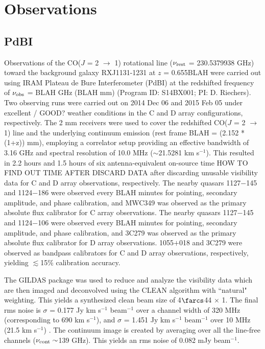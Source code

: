 \documentclass[]{emulateapj}
\begin{document}
\author{Draft}


\section{Observations}
\subsection{PdBI} \label{sec:PdBIdata}
Observations of the CO($J$ = 2 $\rightarrow$ 1) rotational line ($\nu_{\rm rest}$ = 230.5379938 GHz) toward the background galaxy RXJ1131-1231 at $z$ = 0.655BLAH
 were carried out using IRAM Plateau de Bure Interferometer (PdBI) at the redshifted frequency of $\nu_{\rm obs}$ = 
 BLAH GHz (BLAH mm) (Program ID: S14BX001; PI: D. Riechers). 
 Two observing runs were carried out on 2014 Dec 06 and 2015 Feb 05 under excellent / GOOD? 
weather conditions in the C and D array configurations, respectively. The 2 mm receivers were used to cover the redshifted CO($J$ = 2 $\rightarrow$ 1) line and the underlying continuum emission (rest frame BLAH = (2.152 * (1+z)) mm), employing a correlator setup providing an effective bandwidth of 3.16 GHz and spectral resolution of 10.0 MHz ($\sim$21.5281 km s$^{-1}$).
This resulted in 2.2 hours and 1.5 hours of six antenna-equivalent on-source time 
HOW TO FIND OUT TIME AFTER DISCARD DATA
after discarding unusable visibility data for C and D array observations, respectively.
The nearby quasars 1127$-$145 and 1124$-$186 were observed every BLAH minutes for
pointing, secondary amplitude, and phase calibration, and MWC349 was observed as the primary
absolute flux calibrator for C array observations.
The nearby quasars 1127$-$145 and 1124$-$106 were observed every BLAH minutes for
pointing, secondary amplitude, and phase calibration, and 3C279 was observed as the primary
absolute flux calibrator for D array observations.
1055$+$018 and 3C279 were observed as bandpass calibrators for C and D array observations, respectively, yielding $\lesssim
$15\% calibration accuracy.

The GILDAS package was used to reduce and analyze the visibility data which are then imaged and deconvolved using
the CLEAN algorithm with ``natural" weighting. This yields a synthesized clean beam size of 4$\farcs$44 $\times$ 1. The final rms noise is $\sigma$ = 0.177 Jy km s$^{-1}$ beam$^{-1}$ over a channel width of 320 MHz (corresponding to 690 km s$^{-1}$), and $\sigma$ = 1.451 Jy km s$^{-1}$ beam$^{-1}$ over 10 MHz (21.5 km s$^{-1}$) . 
The continuum image is created by %
averaging over all the line-free channels ($\nu_{\rm cont}\sim$139 GHz). This yields an rms noise of 0.082 mJy beam$^{-1}$. %
\end{document}
